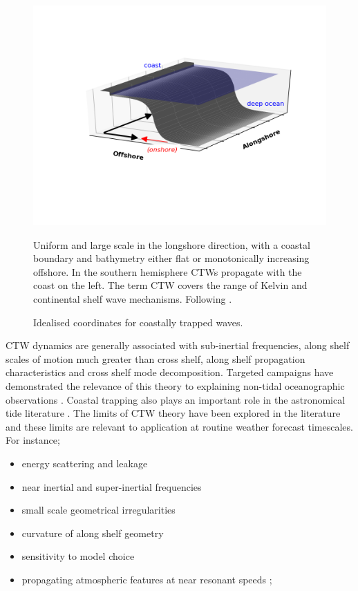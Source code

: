 \begin{figure}[!hbt] \centering
    \includegraphics[width=\figwidthFull]{figures/diagrams/ctw_coords.png}
    \caption{Idealised coordinates for coastally trapped waves.}
    {Uniform and large scale in the longshore direction, with a coastal boundary and bathymetry either flat or monotonically increasing offshore. In the southern hemisphere CTWs propagate with the coast on the left. The term CTW covers the range of Kelvin and continental shelf wave mechanisms.  Following \protect\citep{Dale:2001dn}. }
    \label{fig:ctw_typical}
\end{figure}  
CTW dynamics are generally associated with
sub-inertial frequencies, 
along shelf scales of motion much greater than cross shelf,  
along shelf propagation characteristics
and cross shelf mode decomposition.
Targeted campaigns have demonstrated the relevance of this theory to explaining non-tidal oceanographic observations \citep{Church:1986tl,Merrifield:1992ef,Ding:2012im}.
Coastal trapping also plays an important role in the astronomical tide literature \citep{Anonymous:cyAnLqia}.
The limits of CTW theory have been explored in the literature and these limits are relevant to application at routine weather forecast timescales.
For instance; 
\begin{itemize}
\item energy scattering and leakage \citep{Middleton:1991dq, Merrifield:1994et, Yankovsky:2017en}
\item near inertial and super-inertial frequencies \citep{Dale:2001dn, Dale:1996go} 
\item small scale geometrical irregularities \citep{Wilkin:1990iw,Liao:2011}
\item curvature of along shelf geometry \citep{Grimshaw:1977vu}
\item sensitivity to model choice \citep{Sanson:2012bu}
\item propagating atmospheric features at near resonant speeds \citep{McInnes:2003vl};
\end{itemize}

